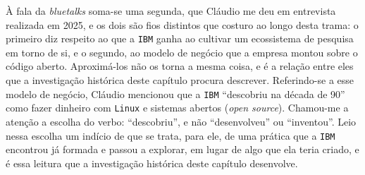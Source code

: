 À fala da \textit{bluetalks} soma-se uma segunda, que Cláudio me deu em entrevista realizada em 2025, e os dois são fios distintos que costuro ao longo desta trama: o primeiro diz respeito ao que a \texttt{IBM} ganha ao cultivar um ecossistema de pesquisa em torno de si, e o segundo, ao modelo de negócio que a empresa montou sobre o código aberto. Aproximá-los não os torna a mesma coisa, e é a relação entre eles que a investigação histórica deste capítulo procura descrever. Referindo-se a esse modelo de negócio, Cláudio mencionou que a \texttt{IBM} \enquote{descobriu na década de 90} como fazer dinheiro com \texttt{Linux} e sistemas abertos (\textit{open source}). Chamou-me a atenção a escolha do verbo: \enquote{descobriu}, e não \enquote{desenvolveu} ou \enquote{inventou}. Leio nessa escolha um indício de que se trata, para ele, de uma prática que a \texttt{IBM} encontrou já formada e passou a explorar, em lugar de algo que ela teria criado, e é essa leitura que a investigação histórica deste capítulo desenvolve.

